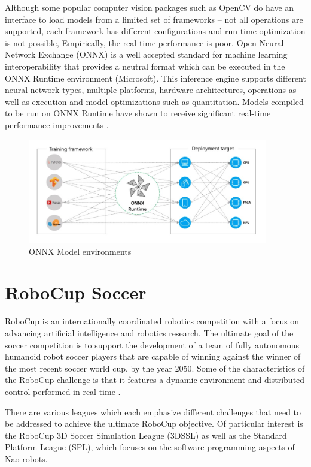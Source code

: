 \documentclass[a4paper,twoside,12pt]{report}
\begin{document}
Although some popular computer vision packages such as OpenCV do have an interface to load models from a limited set of frameworks -- not all operations are supported, each framework has different configurations and run-time optimization is not possible, Empirically, the real-time performance is poor. Open Neural Network Exchange (ONNX) is a well accepted standard \citep{onnx} for machine learning interoperability that provides a neutral format which can be executed in the ONNX Runtime environment (Microsoft). This inference engine supports different neural network types, multiple platforms, hardware architectures, operations as well as execution and model optimizations such as quantitation. Models compiled to be run on ONNX Runtime have shown to receive significant real-time performance improvements \citep{inference}.

\begin{figure}[h!]
\begin{center}
\includegraphics[width=10.5cm]{images/onnx.jpg}
\caption{ONNX Model environments \citep{onnx}}
\label{fig:onnxplot}
\end{center}
\end{figure}

\newpage
\section{RoboCup Soccer}
RoboCup is an internationally coordinated robotics competition with a focus on advancing artificial intelligence and robotics research. The ultimate goal of the soccer competition is to support the development of a team of fully autonomous humanoid robot soccer players that are capable of winning against the winner of the most recent soccer world cup, by the year 2050. Some of the characteristics of the RoboCup challenge is that it features a dynamic environment and distributed control performed in real time \citep{RoboCupObj}.\

There are various leagues which each emphasize different challenges that need to be addressed to achieve the ultimate RoboCup objective. Of particular interest is the RoboCup 3D Soccer Simulation League (3DSSL) as well as the Standard Platform League (SPL), which focuses on the software programming aspects of Nao robots.
\end{document}
